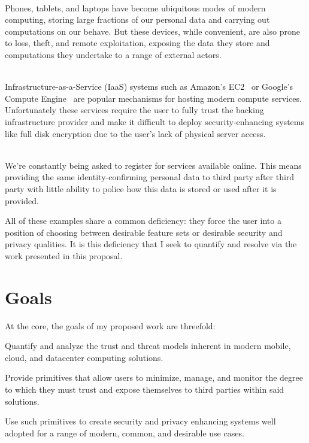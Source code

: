 \begin{packed_desc}
\item[Mobile Computing Devices] \hfill \\ Phones, tablets, and laptops
  have become ubiquitous modes of modern computing, storing large
  fractions of our personal data and carrying out computations on our
  behave. But these devices, while convenient, are also prone to loss,
  theft, and remote exploitation, exposing the data they store and
  computations they undertake to a range of external actors.
\item[Cloud Computing Infrastructure] \hfill
  \\ Infrastructure-as-a-Service (IaaS) systems such as Amazon's
  EC2~\cite{amazon-ec2} or Google's Compute
  Engine~\cite{google-compute} are popular mechanisms for hosting
  modern compute services. Unfortunately these services require the
  user to fully trust the backing infrastructure provider and make it
  difficult to deploy security-enhancing systems like full disk
  encryption due to the user's lack of physical server access.
\item[User Account Registration] \hfill \\ We're constantly being
  asked to register for services available online. This means
  providing the same identity-confirming personal data to third party
  after third party with little ability to police how this data is
  stored or used after it is provided.
\end{packed_desc}

All of these examples share a common deficiency: they force the user
into a position of choosing between desirable feature sets or
desirable security and privacy qualities. It is this deficiency that I
seek to quantify and resolve via the work presented in this proposal.

\section{Goals}
\label{chap:intro:goals}

At the core, the goals of my proposed work are threefold:

\begin{packed_item}
\item Quantify and analyze the trust and threat models inherent in
  modern mobile, cloud, and datacenter computing solutions.
\item Provide primitives that allow users to minimize, manage, and
  monitor the degree to which they must trust and expose themselves to
  third parties within said solutions.
\item Use such primitives to create security and privacy enhancing
  systems well adopted for a range of modern, common, and desirable
  use cases.
\end{packed_item}

